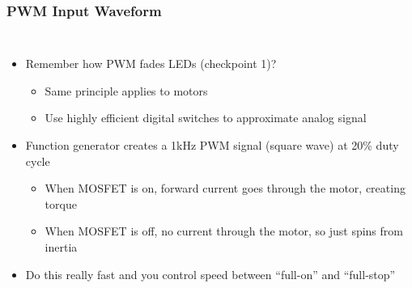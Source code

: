 \documentclass{beamer}
\begin{document}
\begin{frame}
\frametitle{PWM Input Waveform}
\begin{columns}[t]
\begin{itemize}
  \item Remember how PWM fades LEDs (checkpoint 1)?
  \begin{itemize}
    \item Same principle applies to motors
    \item Use highly efficient digital switches to approximate analog signal
  \end{itemize}
  \item Function generator creates a 1kHz PWM signal (square wave) at 20\% duty cycle
  \begin{itemize}
    \item When MOSFET is on, forward current goes through the motor, creating torque
    \item When MOSFET is off, no current through the motor, so just spins from inertia
  \end{itemize}
  \item Do this really fast and you control speed between ``full-on'' and ``full-stop''
\end{itemize}


\end{columns}
\end{frame}
\end{document}
